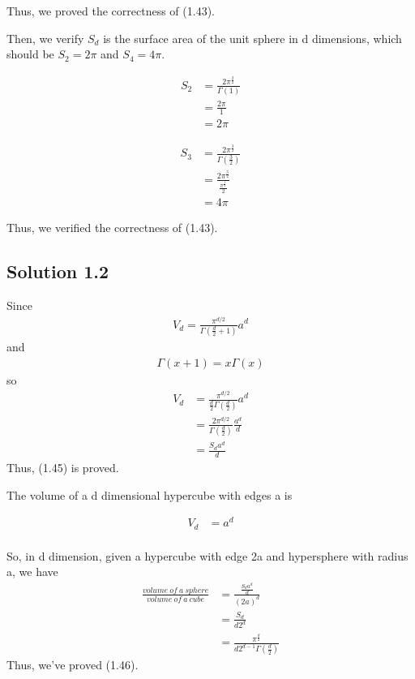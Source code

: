 \documentclass{article} %
\begin{document}
Thus, we proved the correctness of (1.43).

Then, we verify $S_d$ is the surface area of the unit sphere in d dimensions, which should be $S_2=2\pi$ and $S_4=4\pi$.


\begin{align*}
    S_2 &= \frac{2\pi^{\frac{2}{2}}}{\Gamma(1)} \\
    &= \frac{2\pi}{1} \\
    &= 2\pi
\end{align*} 

\begin{align*}
    S_3 &= \frac{2\pi^{\frac{3}{2}}}{\Gamma(\frac{3}{2})} \\
    &= \frac{2\pi^{\frac{3}{2}}}{\frac{\pi^{\frac{1}{2}}}{2}} \\
    &= 4\pi
\end{align*} 

Thus, we verified the correctness of (1.43).

\subsection{Solution 1.2}

Since
\begin{align*}
    V_d = \frac{\pi^{d/2}}{\Gamma(\frac{d}{2} + 1)} a^d
\end{align*} 
and
\begin{align*}
    \Gamma(x + 1) = x\Gamma(x)
\end{align*} 
so
\begin{align*}
    V_d &= \frac{\pi^{d/2}}{\frac{d}{2}\Gamma(\frac{d}{2})} a^d \\
    &= \frac{2\pi^{d/2}}{\Gamma(\frac{d}{2})} \frac{a^d}{d} \\
    &= \frac{S_d a^d}{d}
\end{align*} 
Thus, (1.45) is proved.

The volume of a d dimensional hypercube with edges a is

\begin{align*}
    V_d &= a^d \\
\end{align*}

So, in d dimension, given a hypercube with edge 2a and hypersphere with radius a, we have
\begin{align*}
    \frac{volume\ of\ a\ sphere}{volume\ of\ a\ cube} &= \frac{\frac{S_d a^d}{d}}{(2a)^d} \\
    &= \frac{S_d}{d2^d} \\
    &= \frac{\pi^{\frac{d}{2}}}{d2^{d-1}\Gamma(\frac{d}{2})}
\end{align*} 
Thus, we've proved (1.46).
\end{document}
